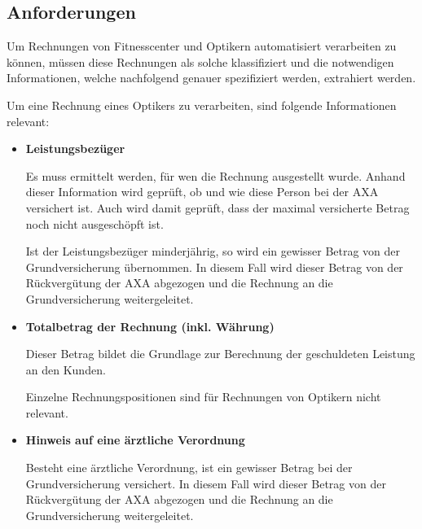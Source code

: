


\subsection{Anforderungen}

Um Rechnungen von Fitnesscenter und Optikern automatisiert verarbeiten zu können, müssen diese Rechnungen als solche klassifiziert und die notwendigen Informationen, welche nachfolgend genauer spezifiziert werden, extrahiert werden.

Um eine Rechnung eines Optikers zu verarbeiten, sind folgende Informationen relevant:

\begin{itemize}
    \item \textbf{Leistungsbezüger}
    
    Es muss ermittelt werden, für wen die Rechnung ausgestellt wurde. Anhand dieser Information wird geprüft, ob und wie diese Person bei der AXA versichert ist. Auch wird damit geprüft, dass der maximal versicherte Betrag noch nicht ausgeschöpft ist.
    
    Ist der Leistungsbezüger minderjährig, so wird ein gewisser Betrag von der Grundversicherung übernommen. In diesem Fall wird dieser Betrag von der Rückvergütung der AXA abgezogen und die Rechnung an die Grundversicherung weitergeleitet.
    
    \item \textbf{Totalbetrag der Rechnung (inkl. Währung)}
    
    Dieser Betrag bildet die Grundlage zur Berechnung der geschuldeten Leistung an den Kunden. 
    
    Einzelne Rechnungspositionen sind für Rechnungen von Optikern nicht relevant.
    
    \item \textbf{Hinweis auf eine ärztliche Verordnung}
    
    Besteht eine ärztliche Verordnung, ist ein gewisser Betrag bei der Grundversicherung versichert. In diesem Fall wird dieser Betrag von der Rückvergütung der AXA abgezogen und die Rechnung an die Grundversicherung weitergeleitet.
\end{itemize}

